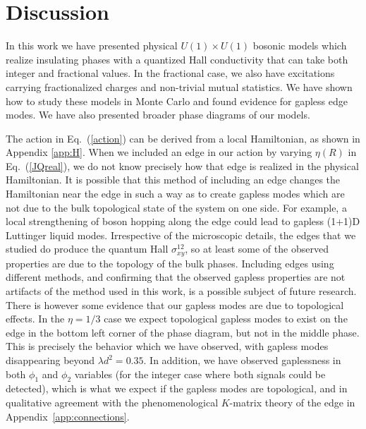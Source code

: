 \section{Discussion}
In this work we have presented physical $U(1) \times U(1)$ bosonic models which realize insulating phases with a quantized Hall conductivity that can take both integer and fractional values. 
In the fractional case, we also have excitations carrying fractionalized charges and non-trivial mutual statistics. We have shown how to study these models in Monte Carlo and found evidence for gapless edge modes. We have also presented broader phase diagrams of our models.

The action in Eq.~(\ref{action}) can be derived from a local Hamiltonian, as shown in Appendix \ref{app:H}. When we included an edge in our action by varying $\eta(R)$ in Eq.~(\ref{JQreal}), we do not know precisely how that edge is realized in the physical Hamiltonian. It is possible that this method of including an edge changes the Hamiltonian near the edge in such a way as to create gapless modes which are not due to the bulk topological state of the system on one side.  For example, a local strengthening of boson hopping along the edge could lead to gapless (1+1)D Luttinger liquid modes.  Irrespective of the microscopic details, the edges that we studied do produce the quantum Hall $\sigma^{12}_{xy}$, so at least some of the observed properties are due to the topology of the bulk phases.  Including edges using different methods, and confirming that the observed gapless properties are not artifacts of the method used in this work, is a possible subject of future research. There is however some evidence that our gapless modes are due to topological effects. In the $\eta=1/3$ case we expect topological gapless modes to exist on the edge in the bottom left corner of the phase diagram, but not in the middle phase. This is precisely the behavior which we have observed, with gapless modes disappearing beyond $\lambda d^2=0.35$. In addition, we have observed gaplessness in both $\phi_1$ and $\phi_2$ variables (for the integer case where both signals could be detected), which is what we expect if the gapless modes are topological, and in qualitative agreement with the phenomenological $K$-matrix theory of the edge in Appendix~\ref{app:connections}. 

